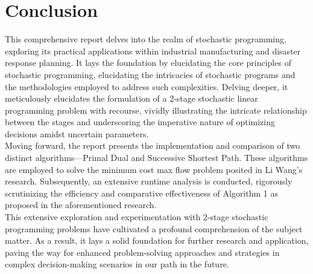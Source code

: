 \newpage
\section{Conclusion}

	\qquad This comprehensive report delves into the realm of stochastic programming, exploring its practical applications within industrial manufacturing and disaster response planning. It lays the foundation by elucidating the core principles of stochastic programming, elucidating the intricacies of stochastic programs and the methodologies employed to address such complexities. Delving deeper, it meticulously elucidates the formulation of a 2-stage stochastic linear programming problem with recourse, vividly illustrating the intricate relationship between the stages and underscoring the imperative nature of optimizing decisions amidst uncertain parameters.\\[6pt]

	\qquad Moving forward, the report presents the implementation and comparison of two distinct algorithms—Primal Dual and Successive Shortest Path. These algorithms are employed to solve the minimum cost max flow problem posited in Li Wang's research. Subsequently, an extensive runtime analysis is conducted, rigorously scrutinizing the efficiency and comparative effectiveness of Algorithm 1 as proposed in the aforementioned research.\\[6pt]

	\qquad This extensive exploration and experimentation with 2-stage stochastic programming problems have cultivated a profound comprehension of the subject matter. As a result, it lays a solid foundation for further research and application, paving the way for enhanced problem-solving approaches and strategies in complex decision-making scenarios in our path in the future.\\[6pt]